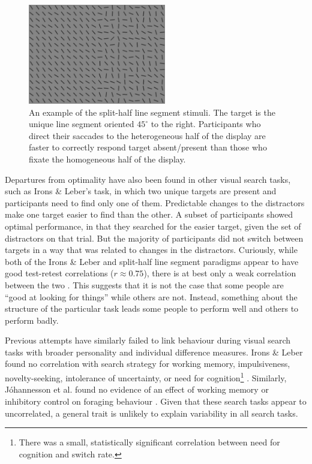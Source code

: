 \documentclass[]{rsos}
\begin{document}
\begin{figure}
\centering
\includegraphics[width=6cm]{Figures/split-half.png}
\caption{An example of the split-half line segment stimuli. The target is the unique line segment oriented $45^{\circ}$ to the right. Participants who direct their saccades to the heterogeneous half of the display are faster to correctly respond target absent/present than those who fixate the homogeneous half of the display.}
\label{fig:stimulus}
\end{figure}

Departures from optimality have also been found in other visual search tasks, such as Irons \& Leber's \cite{irons-leber2016,irons-leber2018} task, in which two unique targets are present and participants need to find only one of them. Predictable changes to the distractors make one target easier to find than the other. A subset of participants showed optimal performance, in that they searched for the easier target, given the set of distractors on that trial. But the majority of participants did not switch between targets in a way that was related to changes in the distractors. Curiously, while both of the Irons \& Leber and split-half line segment paradigms appear to have good test-retest correlations ($r \approx 0.75$), there is at best only a weak correlation between the two \cite{clarke2019}. This suggests that it is not the case that some people are ``good at looking for things'' while others are not. Instead, something about the structure of the particular task leads some people to perform well and others to perform badly.

Previous attempts have similarly failed to link behaviour during visual search tasks with broader personality and individual difference measures. Irons \& Leber found no correlation with search strategy for working memory, impulsiveness, novelty-seeking, intolerance of uncertainty, or need for cognition\footnote{There was a small, statistically significant correlation between need for cognition and switch rate.} \cite{irons-leber2016,irons-leber2018}. Similarly, J{\'o}hannesson et al. found no evidence of an effect of working memory or inhibitory control on foraging behaviour \cite{johannesson2017}. Given that these search tasks appear to uncorrelated, a general trait is unlikely to explain variability in all search tasks.  
\end{document}
